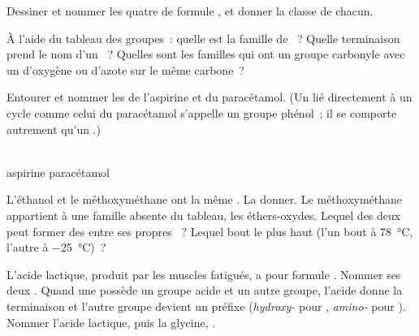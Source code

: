 \begin{exercise}[$\star\star$]\label{exo:g11:functional-groups:10}
Dessiner et nommer les quatre  de formule , et donner
la classe de chacun.
\end{exercise}

\begin{exercise}[$\star\star$]\label{exo:g11:functional-groups:11}
À l'aide du tableau des groupes~: quelle est la famille de
~? Quelle terminaison prend le nom d'un ~? Quelles
sont les familles qui ont un groupe carbonyle avec un 
d'oxygène ou d'azote sur le même carbone~?
\end{exercise}

\begin{exercise}[$\star\star\star$]\label{exo:g11:functional-groups:12}
Entourer et nommer les  de l'aspirine et du
paracétamol. (Un  lié directement à un cycle comme celui du
paracétamol s'appelle un groupe phénol~; il se comporte autrement qu'un
.)
\begin{center}
\qquad
{}
\\[2pt] \small aspirine \hspace{4.2cm} paracétamol
\end{center}
\end{exercise}

\begin{exercise}[$\star\star\star$]\label{exo:g11:functional-groups:13}
L'éthanol  et le méthoxyméthane  ont la
même . La donner. Le méthoxyméthane appartient à une famille
absente du tableau, les éthers-oxydes. Lequel des deux peut former des
 entre ses propres ~? Lequel bout le plus
haut (l'un bout à \qty{78}{\celsius}, l'autre à \qty{-25}{\celsius})~?
\end{exercise}

\begin{exercise}[$\star\star\star$]\label{exo:g11:functional-groups:14}
L'acide lactique, produit par les muscles fatigués, a pour formule
. Nommer ses deux .
Quand une  possède un groupe acide et un autre groupe, l'acide
donne la terminaison et l'autre groupe devient un préfixe
(\emph{hydroxy-} pour , \emph{amino-} pour ). Nommer
l'acide lactique, puis la glycine, .
\end{exercise}

